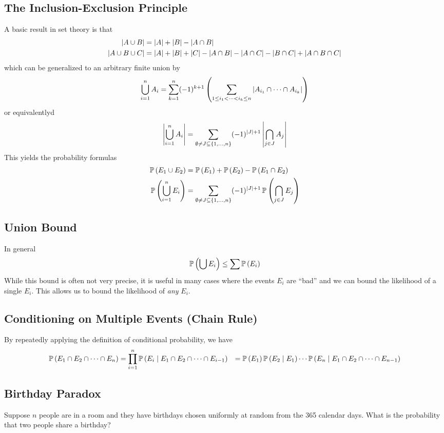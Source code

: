 \subsection{The Inclusion-Exclusion Principle}
A basic result in set theory is that
\begin{align*}
    \left\lvert A \cup B\right\rvert &= \left\lvert A\right\rvert + \left\lvert B\right\rvert - \left\lvert A \cap B\right\rvert\\
    \left\lvert A \cup B \cup C\right\rvert &= \left\lvert A\right\rvert + \left\lvert B\right\rvert + \left\lvert C\right\rvert - \left\lvert A \cap B\right\rvert - \left\lvert A \cap C\right\rvert - \left\lvert B \cap C\right\rvert + \left\lvert A \cap B \cap C\right\rvert
\end{align*}
which can be generalized to an arbitrary finite union by
\[\bigcup_{i=1}^n A_i = \sum_{k=1}^n (-1)^{k+1} \left(\sum_{1 \leq i_1 < \dots < i_k \leq n} \left\lvert A_{i_1} \cap \cdots \cap A_{i_k}\right\rvert \right)\]
or equivalentlyd
\[\left\lvert\bigcup_{i=1}^n A_i\right\rvert = \sum_{\emptyset \neq J \subseteq \left\lbrace1,\dots,n\right\rbrace}
(-1)^{\left\lvert J\right\rvert+1} \left\lvert\bigcap_{j\in J} A_j\right\rvert\]
This yields the probability formulas
\begin{align*}
    \operatorname{\mathbb{P}}\left(E_1 \cup E_2\right) &= \operatorname{\mathbb{P}}\left(E_1\right) + \operatorname{\mathbb{P}}\left(E_2\right) - \operatorname{\mathbb{P}}\left(E_1 \cap E_2\right)\\
    \operatorname{\mathbb{P}}\left(\bigcup_{i=1}^n E_i\right) &= \sum_{\emptyset \neq J \subseteq \left\lbrace1,\dots,n\right\rbrace}
(-1)^{\left\lvert J\right\rvert+1} \operatorname{\mathbb{P}}\left(\bigcap_{j\in J} E_j\right)
\end{align*}

\subsection{Union Bound}
In general
\[\operatorname{\mathbb{P}}\left(\bigcup E_i\right) \leq \sum\operatorname{\mathbb{P}}\left(E_i\right)\]
While this bound is often not very precise, it is useful in many cases where the
events $E_i$ are ``bad'' and we can bound the likelihood of a single $E_i$. This
allows us to bound the likelihood of \emph{any} $E_i$. 

\subsection{Conditioning on Multiple Events (Chain Rule)}
By repeatedly applying the definition of conditional probability, we have
\begin{align*}\operatorname{\mathbb{P}}\left(E_1 \cap E_2 \cap \dots \cap E_n\right)
    &= \prod_{i=1}^n \operatorname{\mathbb{P}}\left(E_i \mid E_1 \cap E_2 \cap \dots \cap E_{i-1}\right)
    &= \operatorname{\mathbb{P}}\left(E_1\right)\operatorname{\mathbb{P}}\left(E_2 \mid E_1\right)\cdots \operatorname{\mathbb{P}}\left(E_n \mid E_1 \cap E_2 \cap \dots \cap E_{n - 1}\right)\\
\end{align*}

\subsection{Birthday Paradox}
Suppose $n$ people are in a room and they have birthdays chosen uniformly at
random from the 365 calendar days. What is the probability that two people share
a birthday?

